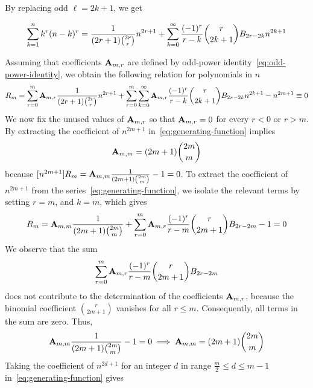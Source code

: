 By replacing odd $\ell = 2k+1$, we get
\begin{proposition}
    \label{prop:bivariate-faulhabers-formula}
    \begin{align*}
        \sum_{k=1}^{n} k^{r} (n-k)^{r}
        = \frac{1}{(2r+1) \binom{2r}r} n^{2r+1}
        + \sum_{k=0}^{\infty} \frac{(-1)^r}{r-k} \binom{r}{2k+1} {B}\sb{2r-2k} n^{2k+1}
    \end{align*}
\end{proposition}
Assuming that coefficients ${\mathbf{A}} \sb{m,r}$ are defined
by odd-power identity~\eqref{eq:odd-power-identity},
we obtain the following relation for polynomials in $n$
\begin{align}
    \label{eq:generating-function}
    R_{m} = \sum_{r=0}^{m} {\mathbf{A}} \sb{m,r} \frac{1}{(2r+1) \binom{2r}{r}} n^{2r+1}
    + \sum_{r=0}^{m} \sum_{k=0}^{\infty} {\mathbf{A}} \sb{m,r} \frac{(-1)^r}{r-k} \binom{r}{2k+1} {B}\sb{2r-2k} n^{2k+1}
    - n^{2m+1} \equiv 0
\end{align}
We now fix the unused values of ${\mathbf{A}} \sb{m,r}$ so that ${\mathbf{A}} \sb{m,r} = 0$ for every $r < 0$ or $r > m$.
By extracting the coefficient of $n^{2m+1}$ in~\eqref{eq:generating-function} implies
\begin{align*}
    {\mathbf{A}} \sb{m,m} = (2m+1)\binom{2m}{m}
\end{align*}
because $[n^{2m+1}]R_m = {\mathbf{A}} \sb{m,m} \frac{1}{(2m+1) \binom{2m}{m}} - 1 = 0$.
To extract the coefficient of $n^{2m+1}$ from the series~\eqref{eq:generating-function},
we isolate the relevant terms by setting $r = m$,
and $k = m$, which gives
\begin{align*}
[n^{2m+1}]
    R_{m}
    = \coeffA{m}{m} \frac{1}{(2m+1) \binom{2m}{m}}
    + \sum_{r=0}^{m} \coeffA{m}{r} \frac{(-1)^r}{r - m} \binom{r}{2m+1} \bernoulli{2r - 2m}
    - 1 = 0
\end{align*}
We observe that the sum
\begin{align*}
    \sum_{r=0}^{m} {\mathbf{A}} \sb{m,r} \frac{(-1)^r}{r - m} \binom{r}{2m+1} {B}\sb{2r - 2m}
\end{align*}
does not contribute to the determination of the coefficients ${\mathbf{A}} \sb{m,r}$, because the binomial coefficient
$\binom{r}{2m+1}$ vanishes for all $r \leq m$.
Consequently, all terms in the sum are zero.
Thus,
\begin{align*}
    {\mathbf{A}} \sb{m,m} \frac{1}{(2m+1) \binom{2m}{m}}  - 1 = 0 \implies {\mathbf{A}} \sb{m,m} = (2m+1) \binom{2m}{m}
\end{align*}
Taking the coefficient of $n^{2d+1}$ for an integer $d$ in range $\frac{m}{2} \leq d \leq m-1$ in~\eqref{eq:generating-function} gives

